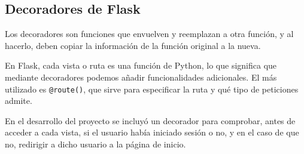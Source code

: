 \subsection{Decoradores de Flask}
Los decoradores son funciones que envuelven y reemplazan a otra función, y al hacerlo, deben copiar la información de la función original a la nueva.

En Flask, cada vista o ruta es una función de Python, lo que significa que mediante decoradores podemos añadir funcionalidades adicionales. El más utilizado es \texttt{@route()}, que sirve para especificar la ruta y qué tipo de peticiones admite. 


En el desarrollo del proyecto se incluyó un decorador para comprobar, antes de acceder a cada vista, si el usuario había iniciado sesión o no, y en el caso de que no, redirigir a dicho usuario a la página de inicio. 




